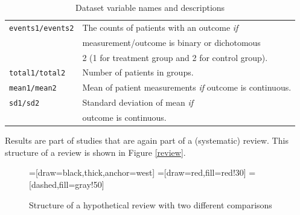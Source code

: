 \documentclass[11pt,a4paper,twoside]{book}\usepackage[]{graphicx}\usepackage[]{color}
\begin{document}
\begin{table}[ht]
\begin{center}
\begin{tabular}{l l}
      \texttt{events1/events2} & The counts of patients with an outcome \textit{if}\\ &measurement/outcome is binary or dichotomous \\ &2 (1 for treatment group and 2 for control group).\\
      \texttt{total1/total2} & Number of patients in groups.\\
      \texttt{mean1/mean2} & Mean of patient measurements \textit{if} outcome is continuous.\\
      \texttt{sd1/sd2} & Standard deviation of mean \textit{if} \\ &outcome is continuous.
    \end{tabular}
  \caption{Dataset variable names and descriptions  \label{variable}}

  \end{center}
\end{table}

Results are part of studies that are again part of a (systematic) review. This structure of a review is shown in Figure \ref{review}. 

\begin{figure}
=[draw=black,thick,anchor=west]
=[draw=red,fill=red!30]
=[dashed,fill=gray!50]
\caption{Structure of a hypothetical review with two different comparisons\label{review.structure}}
\label{review.structure}
\end{figure}
\end{document}
